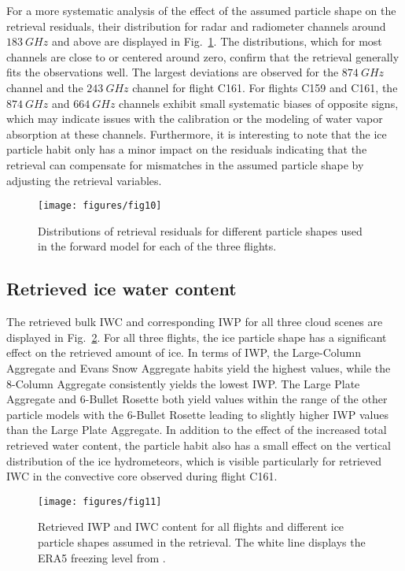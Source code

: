\documentclass[journal abbreviation, manuscript]{copernicus}
\begin{document}
For a more systematic analysis of the effect of the assumed particle shape on
the retrieval residuals, their distribution for radar and radiometer channels
around $183\ \unit{GHz}$ and above are displayed in
Fig.~\ref{fig:residuals_box}. The distributions, which for most channels are
close to or centered around zero, confirm that the retrieval generally fits the
observations well. The largest deviations are observed for the $874\ \unit{GHz}$
channel and the $243\ \unit{GHz}$ channel for flight C161. For flights C159 and
C161, the $874\ \unit{GHz}$ and $664\ \unit{GHz}$ channels exhibit small
systematic biases of opposite signs, which may indicate issues with the
calibration or the modeling of water vapor absorption at these channels.
Furthermore, it is interesting to note that the ice particle habit only has a
minor impact on the residuals indicating that the retrieval can compensate for
mismatches in the assumed particle shape by adjusting the retrieval variables.


\begin{figure}[!hbpt]
  \centering
  \texttt{[image: figures/fig10]}
  \caption{Distributions of retrieval residuals for different particle
    shapes used in the forward model for each of the three flights.}
  \label{fig:residuals_box}
\end{figure}

\subsection{Retrieved ice water content}

The retrieved bulk IWC and corresponding IWP for all three cloud scenes are
displayed in Fig.~\ref{fig:ice_water_content}. For all three flights, the ice
particle shape has a significant effect on the retrieved amount of ice. In terms
of IWP, the Large-Column Aggregate and Evans Snow Aggregate habits yield the
highest values, while the 8-Column Aggregate consistently yields the lowest IWP.
The Large Plate Aggregate and 6-Bullet Rosette both yield values within the
range of the other particle models with the 6-Bullet Rosette leading to slightly
higher IWP values than the Large Plate Aggregate. In addition to the effect of
the increased total retrieved water content, the particle habit also has a small
effect on the vertical distribution of the ice hydrometeors, which is visible
particularly for retrieved IWC in the convective core observed during flight
C161.


\begin{figure}[!hbpt]
  \centering
  \texttt{[image: figures/fig11]}
  \caption{Retrieved IWP and IWC content for all flights and different ice
    particle shapes assumed in the retrieval. The white line displays the ERA5
    freezing level from \citet{era5}.
  }
  \label{fig:ice_water_content}
\end{figure}
\end{document}
